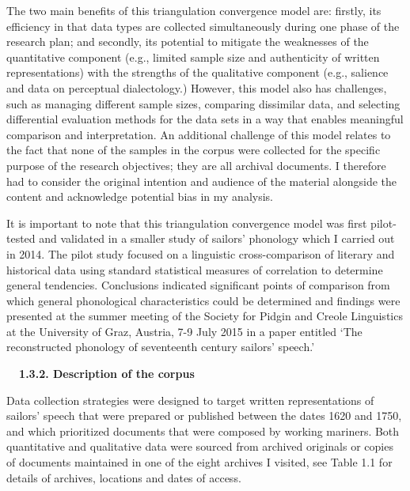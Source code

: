 \begin{styleNormali}
The two main benefits of this triangulation convergence model are: firstly, its efficiency in that data types are collected simultaneously during one phase of the research plan; and secondly, its potential to mitigate the weaknesses of the quantitative component (e.g., limited sample size and authenticity of written representations) with the strengths of the qualitative component (e.g., salience and data on perceptual dialectology.) However, this model also has challenges, such as managing different sample sizes, comparing dissimilar data, and selecting differential evaluation methods for the data sets in a way that enables meaningful comparison and interpretation. An additional challenge of this model relates to the fact that none of the samples in the corpus were collected for the specific purpose of the research objectives; they are all archival documents. I therefore had to consider the original intention and audience of the material alongside the content and acknowledge potential bias in my analysis. 
\end{styleNormali}

\begin{styleNormali}
It is important to note that this triangulation convergence model was first pilot-tested and validated in a smaller study of sailors’ phonology which I carried out in 2014. The pilot study focused on a linguistic cross-comparison of literary and historical data using standard statistical measures of correlation to determine general tendencies. Conclusions indicated significant points of comparison from which general phonological characteristics could be determined and findings were presented at the summer meeting of the Society for Pidgin and Creole Linguistics at the University of Graz, Austria, 7-9 July 2015 in a paper entitled ‘The reconstructed phonology of seventeenth century sailors’ speech.’
\end{styleNormali}

\begin{styleNormali}
\textbf{\ \ 1.3.2. Description of the corpus}
\end{styleNormali}

\begin{styleNormali}
Data collection strategies were designed to target written representations of sailors’ speech that were prepared or published between the dates 1620 and 1750, and which prioritized documents that were composed by working mariners. Both quantitative and qualitative data were sourced from archived originals or copies of documents maintained in one of the eight archives I visited, see Table 1.1 for details of archives, locations and dates of access.
\end{styleNormali}

